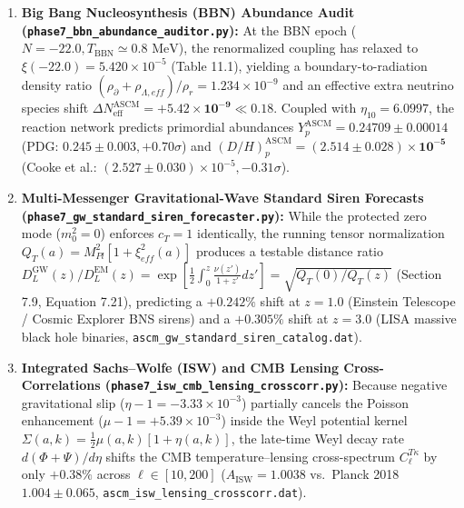 \documentclass[aps,prd,onecolumn,superscriptaddress,nofootinbib,longbibliography,10pt]{revtex4-2}
\begin{document}
{{\begin{enumerate}
  
\item \textbf{Big Bang Nucleosynthesis (BBN) Abundance Audit (\texttt{phase7_bbn_abundance_auditor.py}):} At the BBN epoch (\(N = -22.0, T_{\mathrm{BBN}} \simeq 0.8\text{ MeV}\)), the renormalized coupling has relaxed to \(\xi(-22.0) = 5.420 \times 10^{-5}\) (Table 11.1), yielding a boundary-to-radiation density ratio \((\rho_{\partial} + \rho_{\Lambda,eff})/\rho_r = 1.234 \times 10^{-9}\) and an effective extra neutrino species shift \(\Delta N_{\mathrm{eff}}^{\mathrm{ASCM}} = \mathbf{+5.42 \times 10^{-9}} \ll 0.18\). Coupled with \(\eta_{10} = 6.0997\), the reaction network predicts primordial abundances \(Y_p^{\mathrm{ASCM}} = \mathbf{0.24709 \pm 0.00014}\) (PDG: \(0.245 \pm 0.003, +0.70\sigma\)) and \((D/H)_p^{\mathrm{ASCM}} = \mathbf{(2.514 \pm 0.028) \times 10^{-5}}\) (Cooke et al.: \((2.527 \pm 0.030) \times 10^{-5}, -0.31\sigma\)).
  
\item \textbf{Multi-Messenger Gravitational-Wave Standard Siren Forecasts (\texttt{phase7_gw_standard_siren_forecaster.py}):} While the protected zero mode (\(m_0^2 = 0\)) enforces \(c_T = 1\) identically, the running tensor normalization \(Q_T(a) = M_{Pl}^2[1 + \xi_{eff}^2(a)]\) produces a testable distance ratio \(D_L^{\mathrm{GW}}(z)/D_L^{\mathrm{EM}}(z) = \exp\left[\frac{1}{2}\int_0^z \frac{\nu(z')}{1+z'}dz'\right] = \sqrt{Q_T(0)/Q_T(z)}\) (Section 7.9, Equation 7.21), predicting a \(+0.242\%\) shift at \(z = 1.0\) (Einstein Telescope / Cosmic Explorer BNS sirens) and a \(+0.305\%\) shift at \(z = 3.0\) (LISA massive black hole binaries, \texttt{ascm_gw_standard_siren_catalog.dat}).
  
\item \textbf{Integrated Sachs–Wolfe (ISW) and CMB Lensing Cross-Correlations (\texttt{phase7_isw_cmb_lensing_crosscorr.py}):} Because negative gravitational slip (\(\eta - 1 = -3.33 \times 10^{-3}\)) partially cancels the Poisson enhancement (\(\mu - 1 = +5.39 \times 10^{-3}\)) inside the Weyl potential kernel \(\Sigma(a,k) = \frac{1}{2}\mu(a,k)[1 + \eta(a,k)]\), the late-time Weyl decay rate \(d(\Phi+\Psi)/d\eta\) shifts the CMB temperature–lensing cross-spectrum \(C_\ell^{T\kappa}\) by only \(+0.38\%\) across \(\ell \in [10, 200]\) (\(A_{\mathrm{ISW}} = 1.0038\) vs.\ Planck 2018 \(1.004 \pm 0.065\), \texttt{ascm_isw_lensing_crosscorr.dat}).
  

\end{enumerate}}}
\end{document}

